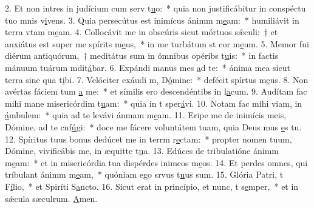 2. Et non intres in judícium cum serv t\uline{u}o:~* quia non justificábitur in conspéctu tuo mnis v\uline{i}vens.
3. Quia persecútus est inimícus ánimm m\uline{e}am:~* humiliávit in terra vtam m\uline{e}am.
4. Collocávit me in obscúris sicut mórtuos sǽculi:~† et anxiátus est super me spírits m\uline{e}us,~* in me turbátum st cor m\uline{e}um.
5. Memor fui diérum antiquórum,~† meditátus sum in ómnibus opéribs t\uline{u}is:~* in factis mánuum tuárum mdit\uline{á}bar.
6. Expándi manus mes \uline{a}d te:~* ánima mea sicut terra sine qua t\uline{i}bi.
7. Velóciter exáudi m, D\uline{ó}mine:~* defécit spírtus m\uline{e}us.
8. Non avértas fáciem tum \uline{a} me:~* et símilis ero descendéntibs in l\uline{a}cum.
9. Audítam fac mihi mane misericórdim t\uline{u}am:~* quia in t sper\uline{á}vi.
10. Notam fac mihi viam, in  \uline{á}mbulem:~* quia ad te levávi ánmam m\uline{e}am.
11. Eripe me de inimícis meis, Dómine, ad te cnf\uline{ú}gi:~* doce me fácere voluntátem tuam, quia Deus mus \uline{e}s tu.
12. Spíritus tuus bonus dedúcet me in terrm r\uline{e}ctam:~* propter nomen tuum, Dómine, vivificábis me, in æquitte t\uline{u}a.
13. Edúces de tribulatióne ánimm m\uline{e}am:~* et in misericórdia tua dispérdes inimcos m\uline{e}os.
14. Et perdes omnes, qui tríbulant ánimm m\uline{e}am,~* quóniam ego srvus t\uline{u}us sum.
15. Glória Patri, t F\uline{í}lio,~* et Spiríti S\uline{a}ncto.
16. Sicut erat in princípio, et nunc, t s\uline{e}mper,~* et in sǽcula sæculrum. \uline{A}men.
